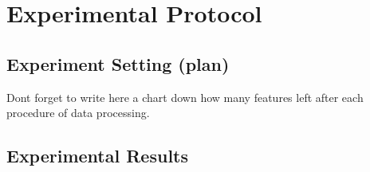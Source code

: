 \chapter{Experimental Protocol}\label{Chapter:5}


\section{Experiment Setting (plan)}

Dont forget to write here a chart down how many features left after each procedure of data processing.

\section{Experimental Results}










